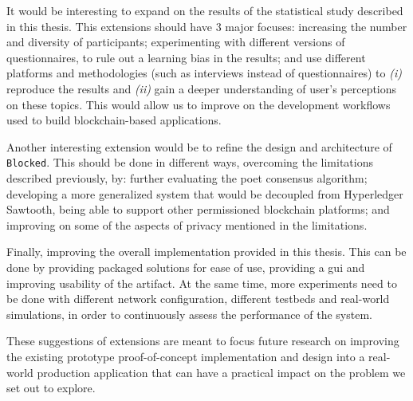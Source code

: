 It would be interesting to expand on the results of the statistical study described in this thesis. This extensions should have 3 major focuses: increasing the number and diversity of participants; experimenting with different versions of questionnaires, to rule out a learning bias in the results; and use different platforms and methodologies (such as interviews instead of questionnaires) to \emph{(i)} reproduce the results and \emph{(ii)} gain a deeper understanding of user's perceptions on these topics. This would allow us to improve on the development workflows used to build blockchain-based applications.

Another interesting extension would be to refine the design and architecture of \texttt{Blocked}. This should be done in different ways, overcoming the limitations described previously, by: further evaluating the \gls{poet} consensus algorithm; developing a more generalized system that would be decoupled from Hyperledger Sawtooth, being able to support other permissioned blockchain platforms; and improving on some of the aspects of privacy mentioned in the limitations.

Finally, improving the overall implementation provided in this thesis. This can be done by providing packaged solutions for ease of use, providing a \gls{gui} and improving usability of the artifact. At the same time, more experiments need to be done with different network configuration, different testbeds and real-world simulations, in order to continuously assess the performance of the system.

These suggestions of extensions are meant to focus future research on improving the existing prototype proof-of-concept implementation and design into a real-world production application that can have a practical impact on the problem we set out to explore.




